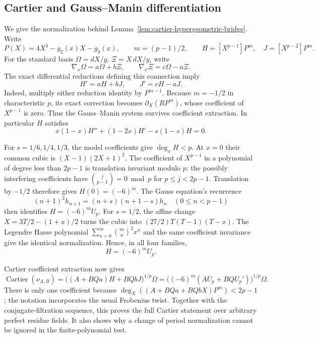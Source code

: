 \subsection{Cartier and Gauss--Manin differentiation}
\label{rev:cartier-calculation}
We give the normalization behind
Lemma~\ref{lem:cartier-hypergeometric-bridge}.  Write
\[
 P(X)=4X^3-g_2(x)X-g_3(x),\qquad m=(p-1)/2,
 \qquad H=[X^{p-1}]P^m,\quad J=[X^{p-2}]P^m.
\]
For the standard basis $\Omega=dX/y$, $\Xi=X\,dX/y$, write
\[
 \nabla_x\Omega=a\Omega+b\Xi,\qquad
 \nabla_x\Xi=c\Omega-a\Xi.
\]
The exact differential reductions defining this connection imply
\begin{equation}\label{eq:hasse-gm-derivative}
                          H'=aH+bJ,\qquad J'=cH-aJ.
\end{equation}
Indeed, multiply either reduction identity by $P^{m-1}$.
Because $m=-1/2$ in characteristic $p$, its exact correction
becomes $\partial_X(RP^m)$, whose coefficient of $X^{p-1}$ is
zero.  Thus the Gauss--Manin system survives coefficient
extraction.  In particular $H$ satisfies
\[
                 x(1-x)H''+(1-2x)H'-s(1-s)H=0.
\]

For $s=1/6,1/4,1/3$, the model coefficients give $\deg_xH<p$.
At $x=0$ their common cubic is $(X-1)(2X+1)^2$.  The coefficient
of $X^{p-1}$ in a polynomial of degree less than $2p-1$ is
translation invariant modulo $p$: the possibly interfering
coefficients have $\binom{j}{p-1}=0\bmod p$ for
$p\le j<2p-1$.  Translation by $-1/2$ therefore gives
$H(0)=(-6)^m$.  The Gauss equation's recurrence
\[
       (n+1)^2h_{n+1}=(n+s)(n+1-s)h_n\quad(0\le n<p-1)
\]
then identifies $H=(-6)^mU_p$.
For $s=1/2$, the affine change
$X=3T/2-(1+x)/2$ turns the cubic into
$(27/2)T(T-1)(T-x)$.  The Legendre Hasse polynomial
$\sum_{n=0}^m\binom mn^2x^n$ and the same coefficient
invariance give the identical normalization.  Hence, in all four
families,
\begin{equation}\label{eq:hasse-hypergeometric}
                  H=(-6)^mU_p.
\end{equation}

Cartier coefficient extraction now gives
\[
 \operatorname{Cartier}(\nu_{A,B})
 =\bigl((A+BQa)H+BQbJ\bigr)^{1/p}\Omega
 =\bigl((-6)^m(AU_p+BQU_p')\bigr)^{1/p}\Omega.
\]
There is only one coefficient because
$\deg_X((A+BQa+BQbX)P^m)<2p-1$; the notation incorporates
the usual Frobenius twist.  Together with the conjugate-filtration
sequence, this proves the full Cartier statement over arbitrary
perfect residue fields.  It also shows why a change of period
normalization cannot be ignored in the finite-polynomial test.

